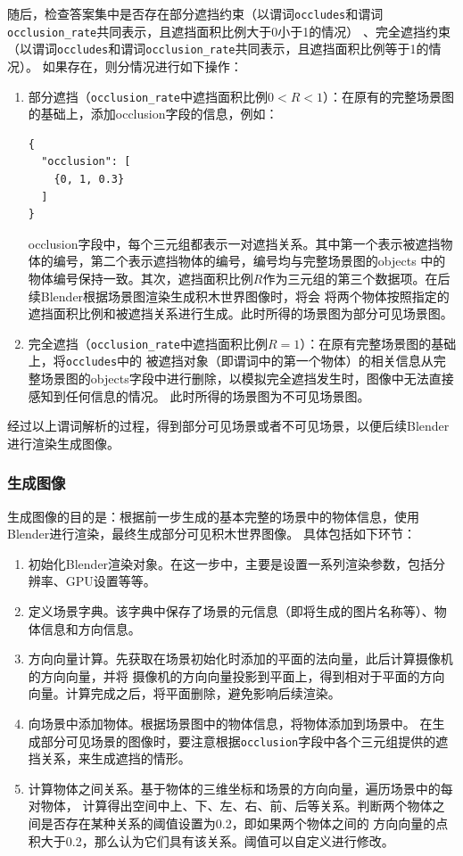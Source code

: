 随后，检查答案集中是否存在部分遮挡约束（以谓词\texttt{occludes}和谓词\texttt{occlusion\_rate}共同表示，且遮挡面积比例大于0小于1的情况）
、完全遮挡约束（以谓词\texttt{occludes}和谓词\texttt{occlusion\_rate}共同表示，且遮挡面积比例等于1的情况）。
如果存在，则分情况进行如下操作：
\begin{enumerate}[nosep]
\item 部分遮挡（\texttt{occlusion\_rate}中遮挡面积比例$0 < R < 1$）：在原有的完整场景图的基础上，添加occlusion字段的信息，例如：
\begin{lstlisting}
{
  "occlusion": [
    {0, 1, 0.3}
  ]
}
\end{lstlisting}
occlusion字段中，每个三元组都表示一对遮挡关系。其中第一个表示被遮挡物体的编号，第二个表示遮挡物体的编号，编号均与完整场景图的objects
中的物体编号保持一致。其次，遮挡面积比例$R$作为三元组的第三个数据项。在后续Blender根据场景图渲染生成积木世界图像时，将会
将两个物体按照指定的遮挡面积比例和被遮挡关系进行生成。此时所得的场景图为部分可见场景图。
\item 完全遮挡（\texttt{occlusion\_rate}中遮挡面积比例$R = 1$）：在原有完整场景图的基础上，将\texttt{occludes}中的
被遮挡对象（即谓词中的第一个物体）的相关信息从完整场景图的objects字段中进行删除，以模拟完全遮挡发生时，图像中无法直接感知到任何信息的情况。
此时所得的场景图为不可见场景图。
\end{enumerate}
经过以上谓词解析的过程，得到部分可见场景或者不可见场景，以便后续Blender进行渲染生成图像。
\subsubsection{生成图像}
\label{image-generation}
生成图像的目的是：根据前一步生成的基本完整的场景中的物体信息，使用Blender进行渲染，最终生成部分可见积木世界图像。
具体包括如下环节：
\begin{enumerate}[nosep]
\item 初始化Blender渲染对象。在这一步中，主要是设置一系列渲染参数，包括分辨率、GPU设置等等。
\item 定义场景字典。该字典中保存了场景的元信息（即将生成的图片名称等）、物体信息和方向信息。
\item 方向向量计算。先获取在场景初始化时添加的平面的法向量，此后计算摄像机的方向向量，并将
摄像机的方向向量投影到平面上，得到相对于平面的方向向量。计算完成之后，将平面删除，避免影响后续渲染。
\item 向场景中添加物体。根据场景图中的物体信息，将物体添加到场景中。
在生成部分可见场景的图像时，要注意根据\texttt{occlusion}字段中各个三元组提供的遮挡关系，来生成遮挡的情形。
\item 计算物体之间关系。基于物体的三维坐标和场景的方向向量，遍历场景中的每对物体，
计算得出空间中上、下、左、右、前、后等关系。判断两个物体之间是否存在某种关系的阈值设置为0.2，即如果两个物体之间的
方向向量的点积大于0.2，那么认为它们具有该关系。阈值可以自定义进行修改。
\end{enumerate}

